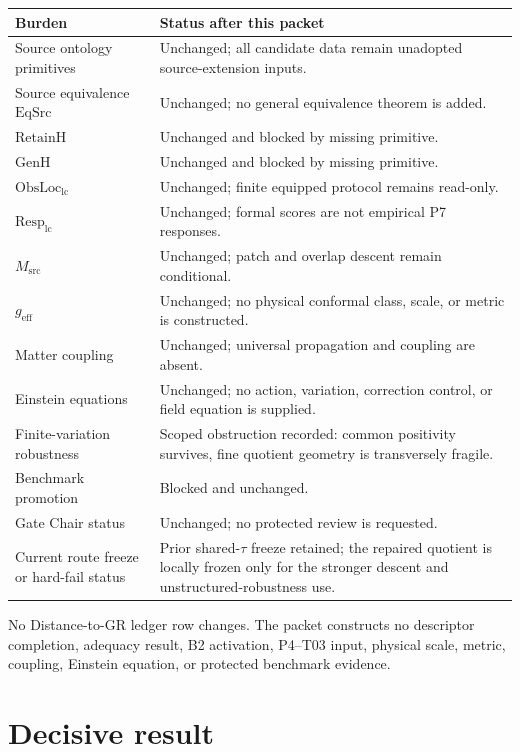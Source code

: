 \documentclass[11pt]{article}
\begin{document}
\begin{longtable}{>{\raggedright\arraybackslash}p{}
                  >{\raggedright\arraybackslash}p{}}
\toprule
Burden & Status after this packet\\
\midrule
\endhead
Source ontology primitives & Unchanged; all candidate data remain unadopted
source-extension inputs.\\
Source equivalence $\mathrm{EqSrc}$ & Unchanged; no general equivalence theorem
is added.\\
$\mathrm{RetainH}$ & Unchanged and blocked by missing primitive.\\
$\mathrm{GenH}$ & Unchanged and blocked by missing primitive.\\
$\mathrm{ObsLoc}_{\mathrm{lc}}$ & Unchanged; finite equipped protocol remains
read-only.\\
$\mathrm{Resp}_{\mathrm{lc}}$ & Unchanged; formal scores are not empirical P7
responses.\\
$M_{\mathrm{src}}$ & Unchanged; patch and overlap descent remain conditional.\\
$g_{\mathrm{eff}}$ & Unchanged; no physical conformal class, scale, or metric is
constructed.\\
Matter coupling & Unchanged; universal propagation and coupling are absent.\\
Einstein equations & Unchanged; no action, variation, correction control, or
field equation is supplied.\\
Finite-variation robustness & Scoped obstruction recorded: common positivity
survives, fine quotient geometry is transversely fragile.\\
Benchmark promotion & Blocked and unchanged.\\
Gate Chair status & Unchanged; no protected review is requested.\\
Current route freeze or hard-fail status & Prior shared-$\tau$ freeze retained;
the repaired quotient is locally frozen only for the stronger descent and
unstructured-robustness use.\\
\bottomrule
\end{longtable}

No Distance-to-GR ledger row changes.  The packet constructs no descriptor
completion, adequacy result, B2 activation, P4--T03 input, physical scale,
metric, coupling, Einstein equation, or protected benchmark evidence.

\section{Decisive result}
\end{document}
